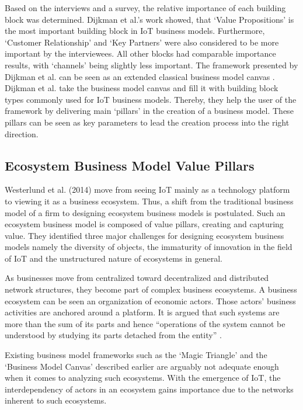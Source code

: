 		Based on the interviews and a survey, the relative importance of each building block was determined. Dijkman et al.'s work showed, that `Value Propositions' is the most important building block in IoT business models. Furthermore, `Customer Relationship' and `Key Partners' were also considered to be more important by the interviewees. All other blocks had comparable importance results, with `channels' being slightly less important. The framework presented by Dijkman et al. can be seen as an extended classical business model canvas \cite{bmc}. Dijkman et al. take the business model canvas and fill it with building block types commonly used for IoT business models. Thereby, they help the user of the framework by delivering main `pillars' in the creation of a business model. These pillars can be seen as key parameters to lead the creation process into the right direction. 

	\subsection{Ecosystem Business Model Value Pillars}
		Westerlund et al. (2014) \cite{westerlund} move from seeing IoT mainly as a technology platform to viewing it as a business ecosystem. Thus, a shift from the traditional business model of a firm to designing ecosystem business models is postulated. Such an ecosystem business model is composed of value pillars, creating and capturing value. They identified three major challenges for designing ecosystem business models namely the diversity of objects, the immaturity of innovation in the field of IoT and the unstructured nature of ecosystems in general.

		As businesses move from centralized toward decentralized and distributed network structures, they become part of complex business ecosystems. A business ecosystem can be seen an organization of economic actors. Those actors' business activities are anchored around a platform. It is argued that such systems are more than the sum of its parts and hence ``operations of the system cannot be understood by studying its parts detached from the entity'' \cite{westerlund} .

		Existing business model frameworks such as the `Magic Triangle' and the `Business Model Canvas' described earlier are arguably not adequate enough when it comes to analyzing such ecosystems. With the emergence of IoT, the interdependency of actors in an ecosystem gains importance due to the networks inherent to such ecosystems.

